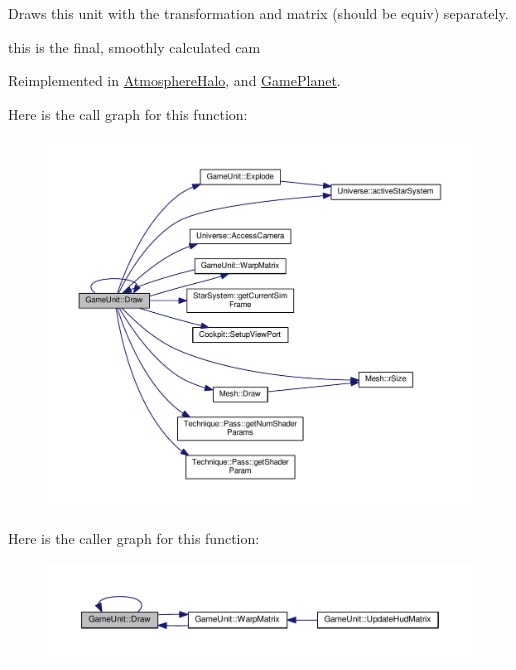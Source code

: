 Draws this unit with the transformation and matrix (should be equiv) separately. 

this is the final, smoothly calculated cam 

Reimplemented in \hyperlink{classAtmosphereHalo_a22e0efeb28321a7341756554d4dc0167}{Atmosphere\+Halo}, and \hyperlink{classGamePlanet_a006a502b61472d5226bdaf0d55aff6e3}{Game\+Planet}.



Here is the call graph for this function\+:
\nopagebreak
\begin{figure}[H]
\begin{center}
\leavevmode
\includegraphics[width=350pt]{de/d19/classGameUnit_a86e85603e44428c44307e0e69cf42dc7_cgraph}
\end{center}
\end{figure}




Here is the caller graph for this function\+:
\nopagebreak
\begin{figure}[H]
\begin{center}
\leavevmode
\includegraphics[width=350pt]{de/d19/classGameUnit_a86e85603e44428c44307e0e69cf42dc7_icgraph}
\end{center}
\end{figure}


